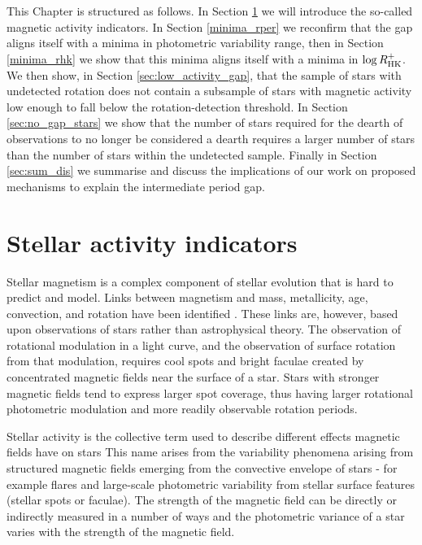 This Chapter is structured as follows. In Section \ref{sec:act_ind} we will introduce the so-called magnetic activity indicators. 
In Section \ref{minima_rper} we reconfirm that the gap aligns itself with a minima in photometric variability range, then in Section \ref{minima_rhk} we show that this minima aligns itself with a minima in $\log R^{+}_{\rm{HK}}$.
We then show, in Section \ref{sec:low_activity_gap}, that the sample of stars with undetected rotation does not contain a subsample of stars with magnetic activity low enough to fall below the rotation-detection threshold.
In Section \ref{sec:no_gap_stars} we show that the number of stars required for the dearth of observations to no longer be considered a dearth requires a larger number of stars than the number of stars within the undetected sample.
Finally in Section \ref{sec:sum_dis} we summarise and discuss the implications of our work on proposed mechanisms to explain the intermediate period gap.


\section{Stellar activity indicators}
\label{sec:act_ind}

Stellar magnetism is a complex component of stellar evolution that is hard to predict and model.
Links between magnetism and mass, metallicity, age, convection, and rotation have been identified \citep{cao_starspots_2022}.
These links are, however, based upon observations of stars rather than astrophysical theory.
The observation of rotational modulation in a light curve, and the observation of surface rotation from that modulation, requires cool spots and bright faculae created by concentrated magnetic fields near the surface of a star.
Stars with stronger magnetic fields tend to express larger spot coverage, thus having larger rotational photometric modulation and more readily observable rotation periods.

Stellar activity is the collective term used to describe different effects magnetic fields have on stars
This name arises from the variability phenomena arising from structured magnetic fields emerging from the convective envelope of stars - for example flares and large-scale photometric variability from stellar surface features (stellar spots or faculae).
The strength of the magnetic field can be directly or indirectly measured in a number of ways and the photometric variance of a star varies with the strength of the magnetic field.

